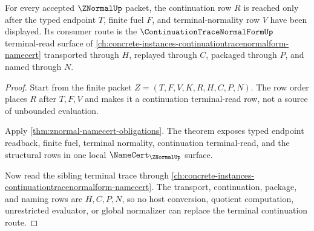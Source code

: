 \begin{theorem}
\label{thm:znormal-continuation-terminal-route}
For every accepted $\ZNormalUp$ packet, the continuation row $R$ is reached only after the typed endpoint $T$, finite fuel $F$, and terminal-normality row $V$ have been displayed. Its consumer route is the $\ContinuationTraceNormalFormUp$ terminal-read surface of \autoref{ch:concrete-instances-continuationtracenormalform-namecert} transported through $H$, replayed through $C$, packaged through $P$, and named through $N$.
\end{theorem}
\begin{proof}
Start from the finite packet $Z=(T,F,V,K,R,H,C,P,N)$. The row order places $R$ after $T,F,V$ and makes it a continuation terminal-read row, not a source of unbounded evaluation.

Apply \autoref{thm:znormal-namecert-obligations}. The theorem exposes typed endpoint readback, finite fuel, terminal normality, continuation terminal-read, and the structural rows in one local $\NameCert_{\ZNormalUp}$ surface.

Now read the sibling terminal trace through \autoref{ch:concrete-instances-continuationtracenormalform-namecert}. The transport, continuation, package, and naming rows are $H,C,P,N$, so no host conversion, quotient computation, unrestricted evaluator, or global normalizer can replace the terminal continuation route.
\end{proof}

